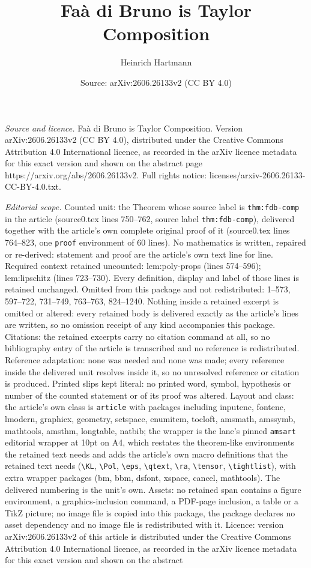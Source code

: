 \documentclass[10pt,a4paper]{amsart}
\title[Fa\`a di Bruno is Taylor Composition]{Fa\`a di Bruno is Taylor Composition}
\author{Heinrich Hartmann}
\date{Source: arXiv:2606.26133v2 (CC BY 4.0)}
\begin{document}
\maketitle

\noindent\emph{Source and licence.} Fa\`a di Bruno is Taylor Composition. Version arXiv:2606.26133v2 (CC BY 4.0), distributed under the Creative Commons Attribution 4.0 International licence, as recorded in the arXiv licence metadata for this exact version and shown on the abstract page https://arxiv.org/abs/2606.26133v2. Full rights notice: licenses/arxiv-2606.26133-CC-BY-4.0.txt.\par\smallskip

\noindent\textit{Editorial scope.} Counted unit: the Theorem whose source label is \texttt{thm:fdb-comp} in the article (source0.tex lines 750--762, source label \texttt{thm:fdb-comp}), delivered together with the article's own complete original proof of it (source0.tex lines 764--823, one \texttt{proof} environment of 60 lines). No mathematics is written, repaired or re-derived: statement and proof are the article's own text line for line. Required context retained uncounted: lem:poly-props (lines 574--596); lem:lipschitz (lines 723--730). Every definition, display and label of those lines is retained unchanged. Omitted from this package and not redistributed: 1--573, 597--722, 731--749, 763--763, 824--1240. Nothing inside a retained excerpt is omitted or altered: every retained body is delivered exactly as the article's lines are written, so no omission receipt of any kind accompanies this package. Citations: the retained excerpts carry no citation command at all, so no bibliography entry of the article is transcribed and no reference is redistributed. Reference adaptation: none was needed and none was made; every reference inside the delivered unit resolves inside it, so no unresolved reference or citation is produced. Printed slips kept literal: no printed word, symbol, hypothesis or number of the counted statement or of its proof was altered. Layout and class: the article's own class is \texttt{article} with packages including inputenc, fontenc, lmodern, graphicx, geometry, setspace, enumitem, tocloft, amsmath, amssymb, mathtools, amsthm, longtable, natbib; the wrapper is the lane's pinned \texttt{amsart} editorial wrapper at 10pt on A4, which restates the theorem-like environments the retained text needs and adds the article's own macro definitions that the retained text needs (\texttt{\textbackslash KL}, \texttt{\textbackslash Pol}, \texttt{\textbackslash eps}, \texttt{\textbackslash qtext}, \texttt{\textbackslash ra}, \texttt{\textbackslash tensor}, \texttt{\textbackslash tightlist}), with extra wrapper packages (bm, bbm, dsfont, xspace, cancel, mathtools). The delivered numbering is the unit's own. Assets: no retained span contains a figure environment, a graphics-inclusion command, a PDF-page inclusion, a table or a TikZ picture; no image file is copied into this package, the package declares no asset dependency and no image file is redistributed with it. Licence: version arXiv:2606.26133v2 of this article is distributed under the Creative Commons Attribution 4.0 International licence, as recorded in the arXiv licence metadata for this exact version and shown on the abstract 
\end{document}
